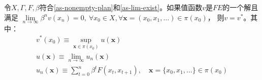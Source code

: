 \begin{theorem} \label{th-solution-fe-sp}
    令$X, \Gamma, F, \beta$符合\cref{as-nonempty-plan}和\cref{as-lim-exist}。如果值函数$v$是$FE$的一个解且满足
    $\lim\limits_{n\rightarrow \infty}\beta^n v\left(x_n\right)=0, ~\forall x_0\in X, 
        \forall \boldsymbol{x}=\left(x_0,x_1,\dots\right)\in \pi\left(x_0\right)$，
    则$v=v^*$。其中：
    \begin{gather*}
        v^*\left(x_0\right) \equiv \sup _{\boldsymbol{x}\in\pi\left(x_0\right)} u\left(\boldsymbol{x}\right) \\
        u\left(\boldsymbol{x}\right) \equiv \lim _{n\rightarrow\infty}u_n\left(\boldsymbol{x}\right) \\
        u_n(\boldsymbol{x}) \equiv \sum_{t=0}^n \beta^t F\left(x_t, x_{t+1}\right), 
            \quad \boldsymbol{x}=\{x_0,x_1,\dots\} \in \pi\left(x_0\right)
    \end{gather*}
\end{theorem}
